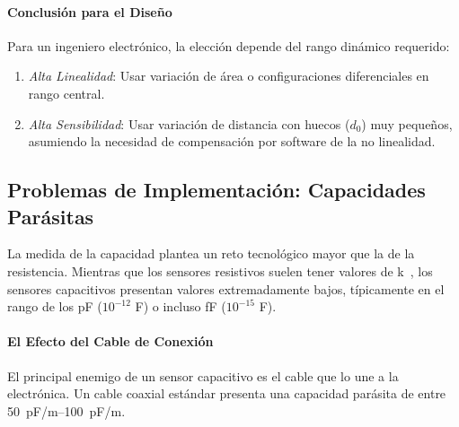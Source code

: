\paragraph{Conclusión para el Diseño}
Para un ingeniero electrónico, la elección depende del rango dinámico requerido:
\begin{enumerate}
    \item \emph{Alta Linealidad}: Usar variación de área o configuraciones diferenciales en rango central.
    \item \emph{Alta Sensibilidad}: Usar variación de distancia con huecos ($d_0$) muy pequeños, asumiendo la necesidad de compensación por software de la no linealidad.
\end{enumerate}

\subsection{Problemas de Implementación: Capacidades Parásitas}

La medida de la capacidad plantea un reto tecnológico mayor que la de la resistencia. Mientras que los sensores resistivos suelen tener valores de \unit{k\Omega}, los sensores capacitivos presentan valores extremadamente bajos, típicamente en el rango de los \unit{pF} ($10^{-12}$ F) o incluso \unit{fF} ($10^{-15}$ F).

\paragraph{El Efecto del Cable de Conexión} El principal enemigo de un sensor capacitivo es el cable que lo une a la electrónica. Un cable coaxial estándar presenta una capacidad parásita de entre \qtyrange{50}{100}{pF/m}. 

